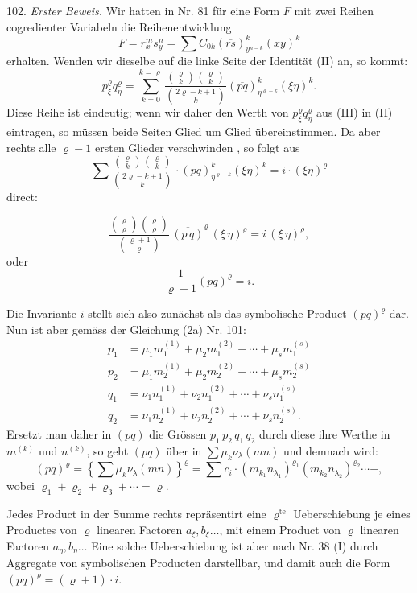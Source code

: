\documentclass[11pt]{article}
\providecommand{\weberpage}[1]{}
\providecommand{\weq}[2]{\begin{equation}\tag{#1}#2\end{equation}}
\begin{document}
102. \textit{Erster Beweis.} Wir hatten in Nr. 81 für eine Form $F$ mit
zwei Reihen cogredienter Variabeln die Reihenentwicklung
\[
F = r_x^m s_y^n = \sum C_{0k}(\overline{rs})^k_{y^{n-k}}(xy)^k
\]
erhalten. Wenden wir dieselbe auf die linke Seite der Identität (II)
an, so kommt:
\weq{III}{p^\varrho_\xi q^\varrho_\eta = \sum_{k=0}^{k=\varrho} \frac{\binom{\varrho}{k}\binom{\varrho}{k}}{\binom{2\varrho-k+1}{k}}(\overline{pq})^k_{\eta^{\varrho-k}}(\xi\eta)^k.}
Diese Reihe ist eindeutig; wenn wir daher den Werth von $p^\varrho_\xi q^\varrho_\eta$
aus (III) in (II) eintragen, so müssen beide Seiten Glied um Glied
übereinstimmen. Da aber rechts alle $\varrho-1$ ersten Glieder verschwinden
, so folgt aus
\[
\sum \frac{\binom{\varrho}{k}\binom{\varrho}{k}}{\binom{2\varrho-k+1}{k}}\cdot(\overline{pq})^k_{\eta^{\varrho-k}}(\xi\eta)^k = i\cdot(\xi\eta)^\varrho
\]
direct:


\weberpage{113}
\[
\frac{\binom{\varrho}{\varrho}\binom{\varrho}{\varrho}}{\binom{\varrho+1}{\varrho}}\,\overline{(p\,q)}^\varrho\,(\xi\,\eta)^\varrho = i\,(\xi\,\eta)^\varrho,
\]
oder
\[
\frac{1}{\varrho+1}(pq)^\varrho = i.
\]

Die Invariante $i$ stellt sich also zunächst als das symbolische Product $(pq)^\varrho$ dar. Nun ist aber gemäss der Gleichung (2a) Nr. 101:
\[
\begin{aligned}
p_1 &= \mu_1 m_1^{(1)} + \mu_2 m_1^{(2)} + \cdots + \mu_s m_1^{(s)}\\
p_2 &= \mu_1 m_2^{(1)} + \mu_2 m_2^{(2)} + \cdots + \mu_s m_2^{(s)}\\
q_1 &= \nu_1 n_1^{(1)} + \nu_2 n_1^{(2)} + \cdots + \nu_s n_1^{(s)}\\
q_2 &= \nu_1 n_2^{(1)} + \nu_2 n_2^{(2)} + \cdots + \nu_s n_2^{(s)}.
\end{aligned}
\]
Ersetzt man daher in $(pq)$ die Grössen $p_1\,p_2\,q_1\,q_2$ durch diese ihre Werthe in $m^{(k)}$ und $n^{(k)}$, so geht $(pq)$ über in $\sum \mu_k \nu_\lambda (mn)$ und demnach wird:
\[
(pq)^\varrho = \left\{\sum \mu_k \nu_\lambda (mn)\right\}^\varrho = \sum c_i \cdot (m_{k_1} n_{\lambda_1})^{\varrho_1} (m_{k_2} n_{\lambda_2})^{\varrho_2} \cdots -, %
\]
wobei $\varrho_1 + \varrho_2 + \varrho_3 + \cdots = \varrho$.

Jedes Product in der Summe rechts repräsentirt eine $\varrho^{\text{te}}$ Ueberschiebung je eines Productes von $\varrho$ linearen Factoren $a_\xi, b_\xi \ldots$, mit einem Product von $\varrho$ linearen Factoren $a_\eta, b_\eta\ldots$ Eine solche Ueberschiebung ist aber nach Nr. 38 (I) durch Aggregate von symbolischen Producten darstellbar, und damit auch die Form $(pq)^\varrho = (\varrho + 1) \cdot i$.
\end{document}
